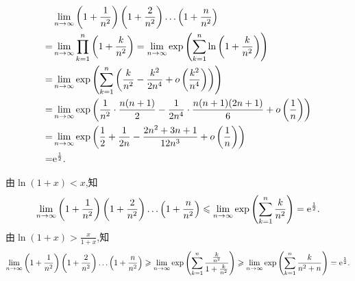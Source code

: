 \begin{solution}
    \begin{align*}
        & \lim_{n \to \infty} \left(1 + \frac{1}{n^2}\right) \left(1 + \frac{2}{n^2}\right) \dots \left(1 + \frac{n}{n^2}\right) \\
     = &\lim_{n \to \infty} \prod_{k=1}^n \left(1 + \frac{k}{n^2}\right) = \lim_{n \to \infty} \exp\left(\sum_{k=1}^n \ln\left(1 + \frac{k}{n^2}\right)\right)          \\
                                                                                                                                                =& \lim_{n \to \infty} \exp\left(\sum_{k=1}^n \left(\frac{k}{n^2} - \frac{k^2}{2 n^4} + o\left(\frac{k^2}{n^4}\right)\right)\right)                                   \\
                                                                                                                                                 =& \lim_{n \to \infty} \exp\left(\frac{1}{n^2} \cdot \frac{n(n+1)}{2} - \frac{1}{2 n^4} \cdot \frac{n(n+1)(2n+1)}{6} + o\left(\frac{1}{n}\right)\right)        \\
                                                                                                                                                =& \lim_{n \to \infty} \exp\left(\frac{1}{2} + \frac{1}{2 n} - \frac{2 n^2 + 3 n + 1}{12 n^3} + o\left(\frac{1}{n}\right)\right)                             \\
                                                                                                                                                =& \mathrm{e}^{\frac{1}{2}}.
    \end{align*}
\end{solution}

\begin{solution}
    由$\ln(1+x) < x$,知
    $$\lim_{n \to \infty} \left(1 + \frac{1}{n^2}\right) \left(1 + \frac{2}{n^2}\right) \dots \left(1 + \frac{n}{n^2}\right) \leqslant \lim_{n \to \infty} \exp\left(\sum_{k=1}^n \frac{k}{n^2}\right) = \mathrm{e}^{\frac{1}{2}}.$$
    由$\ln(1+x) > \frac{x}{1+x}$,知
    $$\lim_{n \to \infty} \left(1 + \frac{1}{n^2}\right) \left(1 + \frac{2}{n^2}\right) \dots \left(1 + \frac{n}{n^2}\right) \geqslant \lim_{n \to \infty} \exp\left(\sum_{k=1}^n \frac{\frac{k}{n^2}}{1 + \frac{k}{n^2}}\right) \geqslant \lim_{n \to \infty} \exp\left(\sum_{k=1}^n \frac{k}{n^2 + n}\right) = \mathrm{e}^{\frac{1}{2}}.$$
\end{solution}

